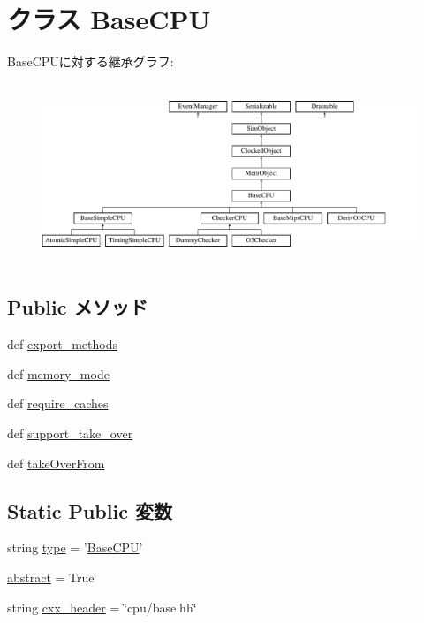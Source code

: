 \hypertarget{classBaseCPU_1_1BaseCPU}{
\section{クラス BaseCPU}
\label{classBaseCPU_1_1BaseCPU}
}
BaseCPUに対する継承グラフ:\begin{figure}[H]
\begin{center}
\leavevmode
\includegraphics[height=5.44444cm]{classBaseCPU_1_1BaseCPU}
\end{center}
\end{figure}
\subsection*{Public メソッド}
\begin{DoxyCompactItemize}
\item 
def \hyperlink{classBaseCPU_1_1BaseCPU_ab373c5eaef9a7b80491a097389260f4a}{export\_\-methods}
\item 
def \hyperlink{classBaseCPU_1_1BaseCPU_a53d73a2f804df6a1dcabb22052d09773}{memory\_\-mode}
\item 
def \hyperlink{classBaseCPU_1_1BaseCPU_afcb2c5440cbf782e304bdb958eadf744}{require\_\-caches}
\item 
def \hyperlink{classBaseCPU_1_1BaseCPU_aa201537acf29724056129b8efad43371}{support\_\-take\_\-over}
\item 
def \hyperlink{classBaseCPU_1_1BaseCPU_ab5272c636861eb61b25aa639a46cfb77}{takeOverFrom}
\end{DoxyCompactItemize}
\subsection*{Static Public 変数}
\begin{DoxyCompactItemize}
\item 
string \hyperlink{classBaseCPU_1_1BaseCPU_acce15679d830831b0bbe8ebc2a60b2ca}{type} = '\hyperlink{classBaseCPU_1_1BaseCPU}{BaseCPU}'
\item 
\hyperlink{classBaseCPU_1_1BaseCPU_a17fa61ac3806b481cafee5593b55e5d0}{abstract} = True
\item 
string \hyperlink{classBaseCPU_1_1BaseCPU_a17da7064bc5c518791f0c891eff05fda}{cxx\_\-header} = \char`\"{}cpu/base.hh\char`\"{}
\end{DoxyCompactItemize}


